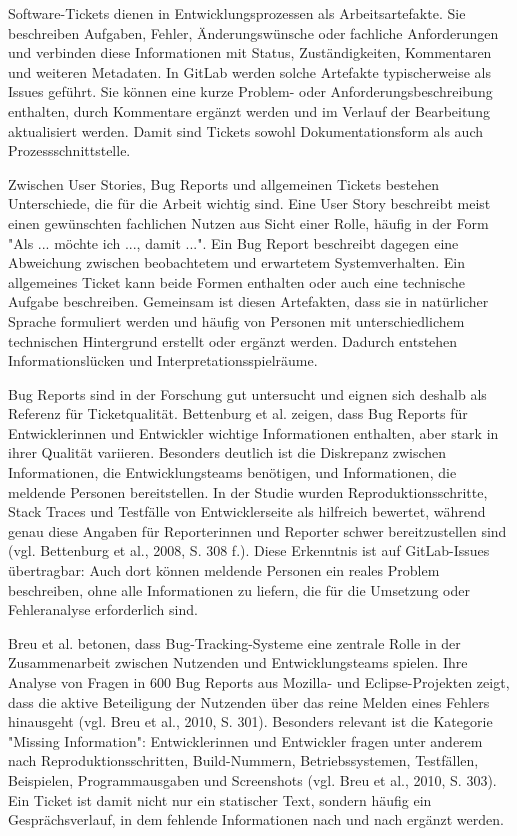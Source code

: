 \documentclass[12pt,a4paper,oneside]{scrreprt}
\begin{document}
Software-Tickets dienen in Entwicklungsprozessen als Arbeitsartefakte. Sie beschreiben Aufgaben, Fehler, Änderungswünsche oder fachliche Anforderungen und verbinden diese Informationen mit Status, Zuständigkeiten, Kommentaren und weiteren Metadaten. In GitLab werden solche Artefakte typischerweise als Issues geführt. Sie können eine kurze Problem- oder Anforderungsbeschreibung enthalten, durch Kommentare ergänzt werden und im Verlauf der Bearbeitung aktualisiert werden. Damit sind Tickets sowohl Dokumentationsform als auch Prozessschnittstelle.

Zwischen User Stories, Bug Reports und allgemeinen Tickets bestehen Unterschiede, die für die Arbeit wichtig sind. Eine User Story beschreibt meist einen gewünschten fachlichen Nutzen aus Sicht einer Rolle, häufig in der Form "Als ... möchte ich ..., damit ...". Ein Bug Report beschreibt dagegen eine Abweichung zwischen beobachtetem und erwartetem Systemverhalten. Ein allgemeines Ticket kann beide Formen enthalten oder auch eine technische Aufgabe beschreiben. Gemeinsam ist diesen Artefakten, dass sie in natürlicher Sprache formuliert werden und häufig von Personen mit unterschiedlichem technischen Hintergrund erstellt oder ergänzt werden. Dadurch entstehen Informationslücken und Interpretationsspielräume.

Bug Reports sind in der Forschung gut untersucht und eignen sich deshalb als Referenz für Ticketqualität. Bettenburg et al. zeigen, dass Bug Reports für Entwicklerinnen und Entwickler wichtige Informationen enthalten, aber stark in ihrer Qualität variieren. Besonders deutlich ist die Diskrepanz zwischen Informationen, die Entwicklungsteams benötigen, und Informationen, die meldende Personen bereitstellen. In der Studie wurden Reproduktionsschritte, Stack Traces und Testfälle von Entwicklerseite als hilfreich bewertet, während genau diese Angaben für Reporterinnen und Reporter schwer bereitzustellen sind (vgl. Bettenburg et al., 2008, S. 308 f.). Diese Erkenntnis ist auf GitLab-Issues übertragbar: Auch dort können meldende Personen ein reales Problem beschreiben, ohne alle Informationen zu liefern, die für die Umsetzung oder Fehleranalyse erforderlich sind.

Breu et al. betonen, dass Bug-Tracking-Systeme eine zentrale Rolle in der Zusammenarbeit zwischen Nutzenden und Entwicklungsteams spielen. Ihre Analyse von Fragen in 600 Bug Reports aus Mozilla- und Eclipse-Projekten zeigt, dass die aktive Beteiligung der Nutzenden über das reine Melden eines Fehlers hinausgeht (vgl. Breu et al., 2010, S. 301). Besonders relevant ist die Kategorie "Missing Information": Entwicklerinnen und Entwickler fragen unter anderem nach Reproduktionsschritten, Build-Nummern, Betriebssystemen, Testfällen, Beispielen, Programmausgaben und Screenshots (vgl. Breu et al., 2010, S. 303). Ein Ticket ist damit nicht nur ein statischer Text, sondern häufig ein Gesprächsverlauf, in dem fehlende Informationen nach und nach ergänzt werden.
\end{document}
